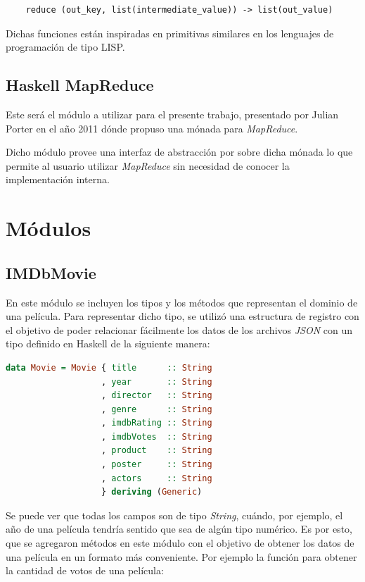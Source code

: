 \documentclass[a4paper,11pt]{article}
\begin{document}
\begin{lstlisting}
	reduce (out_key, list(intermediate_value)) -> list(out_value)
\end{lstlisting}

Dichas funciones están inspiradas en primitivas similares en los lenguajes de programación de tipo LISP.

\subsection{Haskell MapReduce}

Este será el módulo a utilizar para el presente trabajo, presentado por Julian Porter en el año 2011 \cite{porter2011monad} dónde propuso una mónada para \textit{MapReduce}.

Dicho módulo provee una interfaz de abstracción por sobre dicha mónada lo que permite al usuario utilizar \textit{MapReduce} sin necesidad de conocer la implementación interna. 
\section{Módulos}

\subsection{IMDbMovie}

En este módulo se incluyen los tipos y los métodos que representan el dominio de una película. Para representar dicho tipo, se utilizó una estructura de registro con el objetivo de poder relacionar fácilmente los datos de los archivos \textit{JSON} con un tipo definido en Haskell de la siguiente manera:

\begin{lstlisting}[language=Haskell,frame=single]
data Movie = Movie { title      :: String
                   , year       :: String
                   , director   :: String
                   , genre      :: String
                   , imdbRating :: String
                   , imdbVotes  :: String
                   , product    :: String
                   , poster     :: String
                   , actors     :: String 
                   } deriving (Generic)
\end{lstlisting}

Se puede ver que todas los campos son de tipo \textit{String}, cuándo, por ejemplo, el año de una película tendría sentido que sea de algún tipo numérico. Es por esto, que se agregaron métodos en este módulo con el objetivo de obtener los datos de una película en un formato más conveniente.
Por ejemplo la función para obtener la cantidad de votos de una película:
\end{document}
